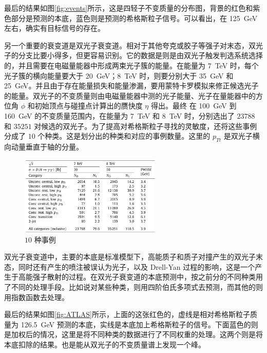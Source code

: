 最后的结果如图\ref{fig:events}所示，这是四轻子不变质量的分布图，背景的红色和紫色部分是预测的本底，蓝色则是预测的希格斯粒子信号。可以看出，在 \qty{125}{GeV} 左右，确实有目标信号的存在。

另一个重要的衰变道是双光子衰变道。相对于其他夸克或胶子等强子对末态，双光子的分支比要小得多，但更容易识别。它的数据是则是由双光子触发判选系统选择的，并且需要在电磁量能器中形成两束光子簇的能量。在能量为 \qty{7}{TeV} 时，每个光子簇的横向能量要大于 \qty{20}{GeV}；\qty{8}{TeV} 时，则要分别大于 \qty{35}{GeV} 和 \qty{25}{GeV}。并且由于存在能量损失和能量渗漏，要用蒙特卡罗模拟来修正候选光子的能量。双光子的不变质量则由电磁量能器中测的光子能量、光子在量能器中的方位角 $\phi$ 和初始顶点与碰撞点计算出的赝快度 $\eta$ 得出。最终 在 \qty{100}{GeV} 到 \qty{160}{GeV} 的不变质量范围内，在能量为 \qty{7}{TeV} 和 \qty{8}{TeV} 时，分别选出了 $23788$ 和 $35251$ 对候选的双光子。为了提高对希格斯粒子寻找的灵敏度，还将这些事例分成了 $10$ 个种类。这是划分出的种类和对应的事例数量。这里的 $p_{Tt}$ 是双光子横向动量垂直于轴的分量。

\begin{figure}[htbp]
    \centering
    \includegraphics[width=0.6\textwidth]{pic/10.png}
    \caption{$10$ 种事例}
    \label{fig:10}
\end{figure}

双光子衰变道中，主要的本底是标准模型下，高能质子和质子对撞产生的双光子末态，同时还有产生的喷注被误认为光子，以及 Drell-Yan 过程的影响，这是一个产生于高能强子散射的过程。在双光子衰变道的本底预测中，按之前分的不同种类用了不同的处理手段。比如说对某些种类，则用四阶伯氏多项式去预测，而其他的则用指数函数去处理。

最后的结果如图\ref{fig:ATLAS}所示，上面的这张红色的，虚线是相对希格斯粒子质量为 \qty{126.5}{GeV} 预测的本底，实线是本底加上希格斯粒子的信号。下面蓝色的则是加权后的情况，这里是将不同种类的数据进行了不同权重的处理。这两个则是将本底扣除的结果。也是能从双光子的不变质量谱上发现一个峰。

